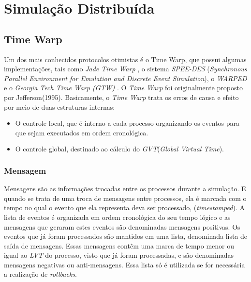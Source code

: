 \chapter{Simulação Distribuída}


\section{Time Warp}
	Um dos mais conhecidos protocolos otimistas é o Time Warp, que possui algumas implementações, tais como \textit{Jade Time Warp} \cite{BAEZNER1}, o sistema \textit{SPEE-DES} (\textit{Synchronous Parallel Environment for Emulation and Discrete Event Simulation})\cite{STEINMAN92}, o \textit{WARPED} \cite{WARPED} e o \textit{Georgia Tech Time Warp (GTW)} \cite{DAS94}. O \textit{Time Warp} foi originalmente proposto por Jefferson(1995). 
	Basicamente, o \textit{Time Warp} trata os erros de causa e efeito por meio de duas estruturas internas:
\begin{itemize}
	\item O controle local, que é interno a cada processo organizando os eventos para que sejam executados em ordem cronológica.
	\item O controle global, destinado ao cálculo do \textit{GVT}(\textit{Global Virtual Time}). 
\end{itemize}



\subsection{Mensagem}
Mensagens são as informações trocadas entre os processos durante a simulação. E quando se trata de uma troca de mensagens entre processos, ela é marcada com o tempo no qual o evento que ela representa deva ser processado, (\textit{timestamped}).
A lista de eventos é organizada em ordem cronológica do seu tempo lógico e as mensagens que geraram estes eventos são denominadas mensagens positivas. Os eventos que já foram processados são mantidos em uma lista, denominada lista de saída de mensagens. Essas mensagens contêm uma marca de tempo menor ou igual ao \textit{LVT} do processo, visto que já foram processadas, e são denominadas mensagens negativas ou anti-mensagens. Essa lista só é utilizada se for necessária a realização de \textit{rollbacks}.

